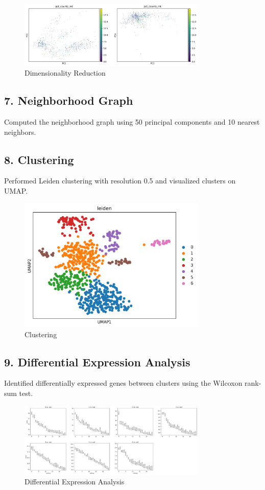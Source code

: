 \documentclass[12pt]{article}
\begin{document}
\begin{figure}[H]
    \centering
    \includegraphics[width=0.8\textwidth]{pca_metrics.png}
    \caption{Dimensionality Reduction}
    \label{fig:pca_metrics}
\end{figure}

\subsection{7. Neighborhood Graph}
Computed the neighborhood graph using 50 principal components and 10 nearest neighbors.

\subsection{8. Clustering}
Performed Leiden clustering with resolution 0.5 and visualized clusters on UMAP.

\begin{figure}[H]
    \centering
    \includegraphics[width=0.8\textwidth]{umap_clusters.png}
    \caption{Clustering}
    \label{fig:umap_clusters}
\end{figure}

\subsection{9. Differential Expression Analysis}
Identified differentially expressed genes between clusters using the Wilcoxon rank-sum test.

\begin{figure}[H]
    \centering
    \includegraphics[width=0.8\textwidth]{de.png}
    \caption{Differential Expression Analysis}
    \label{fig:de}
\end{figure}
\end{document}
